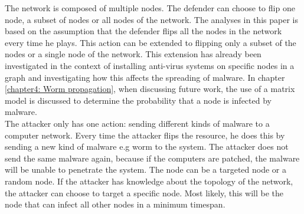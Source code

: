 The network is composed of multiple nodes. The defender can choose to flip one node, a subset of nodes or all nodes of the network. The analyses in this paper is based on the assumption that the defender flips all the nodes in the network every time he plays. This action can be extended to flipping only a subset of the nodes or a single node of the network. This extension has already been investigated in the context of installing anti-virus systems on specific nodes in a graph and investigating how this affects the spreading of malware. 
In chapter \ref{chapter4: Worm propagation}, when discussing future work, the use of a matrix model is discussed to determine the probability that a node is infected by malware.  \\
The attacker only has one action: sending different kinds of malware to a computer network. Every time the attacker flips the resource, he does this by sending a new kind of malware e.g worm to the system. The attacker does not send the same malware again, because if the computers are patched, the malware will be unable to penetrate the system. The node can be a targeted node or a random node. If the attacker has knowledge about the topology of the network, the attacker can choose to target a specific node. Most likely, this will be the node that can infect all other nodes in a minimum timespan.

